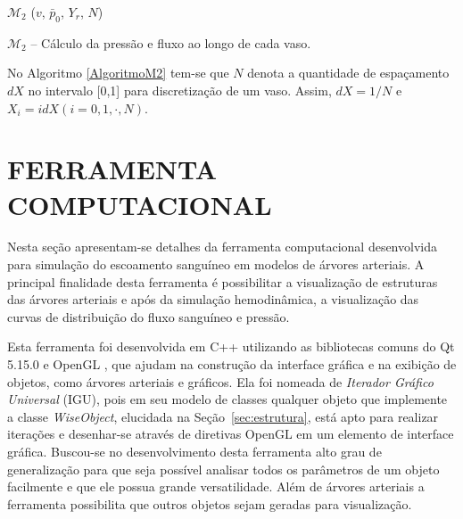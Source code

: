 \documentclass[a4paper,12pt]{monografia}
\theoremstyle{plain}
\theoremstyle{definition}
\theoremstyle{remark}
\begin{document}
\begin{algorithm}[H]
	$\mathcal{M}_2$ ($v$, $\bar{p}_0$, $Y_r$, $N$) \\
	\caption{$\mathcal{M}_2$ -- Cálculo da pressão e fluxo ao longo de cada vaso.}
	\label{AlgoritmoM2}
\end{algorithm}

No Algoritmo \ref{AlgoritmoM2} tem-se que $N$ denota a quantidade de espaçamento $dX$ no intervalo [0,1] para discretização de um vaso. Assim, $dX = 1/N$ e $X_i = i dX (i = 0, 1, \cdot, N)$.

\chapter{FERRAMENTA COMPUTACIONAL}\label{sec:ferramenta_computacional}

Nesta seção apresentam-se detalhes da ferramenta computacional desenvolvida para simulação do escoamento sanguíneo em modelos de árvores arteriais. A principal finalidade desta ferramenta é possibilitar a visualização de estruturas das árvores arteriais e após da simulação hemodinâmica,  a visualização das curvas de distribuição do fluxo sanguíneo e pressão.

Esta ferramenta foi desenvolvida em C++ utilizando as bibliotecas comuns do Qt 5.15.0 \cite{QTClasses} e OpenGL \cite{OpenGL}, que ajudam na construção da interface gráfica e na exibição de objetos, como árvores arteriais e gráficos. Ela foi nomeada de \textit{Iterador Gráfico Universal} (IGU), pois em seu modelo de classes qualquer objeto que implemente a classe \textit{WiseObject}, elucidada na Seção~\ref{sec:estrutura}, está apto para realizar iterações e desenhar-se através de diretivas OpenGL em um elemento de interface gráfica. Buscou-se no desenvolvimento desta ferramenta alto grau de generalização para que seja possível analisar todos os parâmetros de um objeto facilmente e que ele possua grande versatilidade. Além de árvores arteriais a ferramenta possibilita que outros objetos sejam geradas para visualização.
\end{document}
